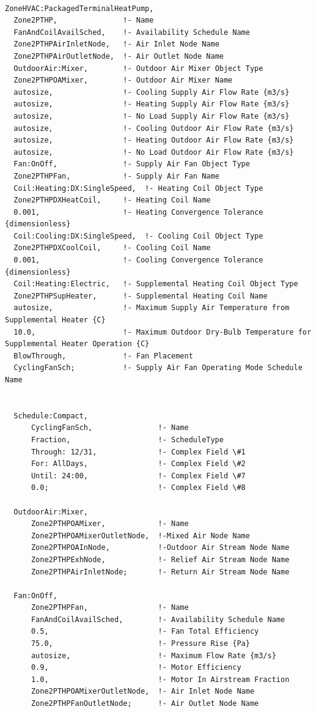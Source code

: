 \begin{lstlisting}

ZoneHVAC:PackagedTerminalHeatPump,
  Zone2PTHP,               !- Name
  FanAndCoilAvailSched,    !- Availability Schedule Name
  Zone2PTHPAirInletNode,   !- Air Inlet Node Name
  Zone2PTHPAirOutletNode,  !- Air Outlet Node Name
  OutdoorAir:Mixer,        !- Outdoor Air Mixer Object Type
  Zone2PTHPOAMixer,        !- Outdoor Air Mixer Name
  autosize,                !- Cooling Supply Air Flow Rate {m3/s}
  autosize,                !- Heating Supply Air Flow Rate {m3/s}
  autosize,                !- No Load Supply Air Flow Rate {m3/s}
  autosize,                !- Cooling Outdoor Air Flow Rate {m3/s}
  autosize,                !- Heating Outdoor Air Flow Rate {m3/s}
  autosize,                !- No Load Outdoor Air Flow Rate {m3/s}
  Fan:OnOff,               !- Supply Air Fan Object Type
  Zone2PTHPFan,            !- Supply Air Fan Name
  Coil:Heating:DX:SingleSpeed,  !- Heating Coil Object Type
  Zone2PTHPDXHeatCoil,     !- Heating Coil Name
  0.001,                   !- Heating Convergence Tolerance {dimensionless}
  Coil:Cooling:DX:SingleSpeed,  !- Cooling Coil Object Type
  Zone2PTHPDXCoolCoil,     !- Cooling Coil Name
  0.001,                   !- Cooling Convergence Tolerance {dimensionless}
  Coil:Heating:Electric,   !- Supplemental Heating Coil Object Type
  Zone2PTHPSupHeater,      !- Supplemental Heating Coil Name
  autosize,                !- Maximum Supply Air Temperature from Supplemental Heater {C}
  10.0,                    !- Maximum Outdoor Dry-Bulb Temperature for Supplemental Heater Operation {C}
  BlowThrough,             !- Fan Placement
  CyclingFanSch;           !- Supply Air Fan Operating Mode Schedule Name


  Schedule:Compact,
      CyclingFanSch,               !- Name
      Fraction,                    !- ScheduleType
      Through: 12/31,              !- Complex Field \#1
      For: AllDays,                !- Complex Field \#2
      Until: 24:00,                !- Complex Field \#7
      0.0;                         !- Complex Field \#8

  OutdoorAir:Mixer,
      Zone2PTHPOAMixer,            !- Name
      Zone2PTHPOAMixerOutletNode,  !-Mixed Air Node Name
      Zone2PTHPOAInNode,           !-Outdoor Air Stream Node Name
      Zone2PTHPExhNode,            !- Relief Air Stream Node Name
      Zone2PTHPAirInletNode;       !- Return Air Stream Node Name

  Fan:OnOff,
      Zone2PTHPFan,                !- Name
      FanAndCoilAvailSched,        !- Availability Schedule Name
      0.5,                         !- Fan Total Efficiency
      75.0,                        !- Pressure Rise {Pa}
      autosize,                    !- Maximum Flow Rate {m3/s}
      0.9,                         !- Motor Efficiency
      1.0,                         !- Motor In Airstream Fraction
      Zone2PTHPOAMixerOutletNode,  !- Air Inlet Node Name
      Zone2PTHPFanOutletNode;      !- Air Outlet Node Name


\end{lstlisting}
